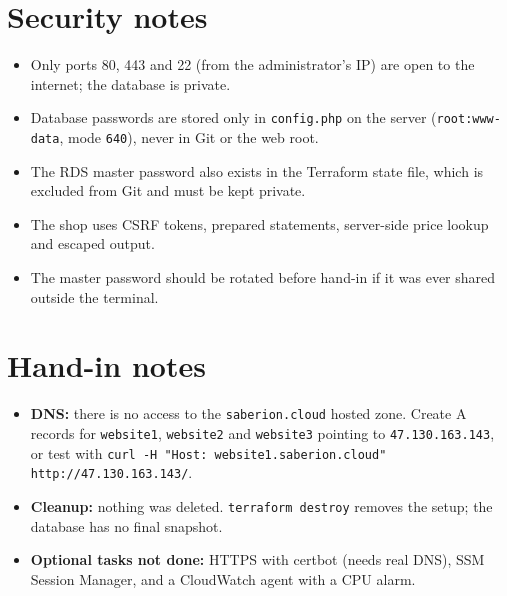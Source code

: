 \documentclass[11pt,a4paper]{article}
\newcommand{\code}[1]{\texttt{#1}}
\begin{document}
\section{Security notes}
\begin{itemize}
  \item Only ports 80, 443 and 22 (from the administrator's IP) are open to the internet;
        the database is private.
  \item Database passwords are stored only in \code{config.php} on the server
        (\code{root:www-data}, mode \code{640}), never in Git or the web root.
  \item The RDS master password also exists in the Terraform state file, which is excluded
        from Git and must be kept private.
  \item The shop uses CSRF tokens, prepared statements, server-side price lookup and
        escaped output.
  \item The master password should be rotated before hand-in if it was ever shared outside
        the terminal.
\end{itemize}

\section{Hand-in notes}
\begin{itemize}
  \item \textbf{DNS:} there is no access to the \code{saberion.cloud} hosted zone. Create A
        records for \code{website1}, \code{website2} and \code{website3} pointing to
        \code{47.130.163.143}, or test with
        \code{curl -H "Host: website1.saberion.cloud" http://47.130.163.143/}.
  \item \textbf{Cleanup:} nothing was deleted. \code{terraform destroy} removes the setup;
        the database has no final snapshot.
  \item \textbf{Optional tasks not done:} HTTPS with certbot (needs real DNS), SSM Session
        Manager, and a CloudWatch agent with a CPU alarm.
\end{itemize}
\end{document}
